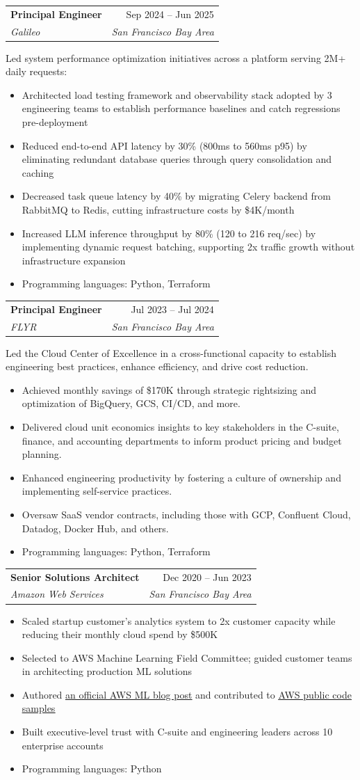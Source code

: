 \documentclass[letterpaper,11pt]{article}
\makeatletter
\newcommand{\resumeItem}[1]{
  \item\small{
    {#1 \vspace{-2pt}}
  }
}
\newcommand{\resumeSubheading}[4]{
  \vspace{-2pt}\item
    \begin{tabular*}{0.97\textwidth}[t]{l@{\extracolsep{\fill}}r}
      \textbf{#1} & #2 \\
      \textit{\small#3} & \textit{\small #4} \\
    \end{tabular*}\vspace{-7pt}
}
\newcommand{\resumeItemListStart}{\begin{itemize}}
\newcommand{\resumeItemListEnd}{\end{itemize}\vspace{-5pt}}
\makeatother
\begin{document}
    \resumeSubheading
      {Principal Engineer}{Sep 2024 -- Jun 2025}
      {Galileo}{San Francisco Bay Area}
      \vspace{2pt}\par
      Led system performance optimization initiatives across a platform serving 2M+ daily requests:
      \resumeItemListStart
        \resumeItem{Architected load testing framework and observability stack adopted by 3 engineering teams to establish performance baselines and catch regressions pre-deployment}
        \resumeItem{Reduced end-to-end API latency by 30\% (800ms to 560ms p95) by eliminating redundant database queries through query consolidation and caching}
        \resumeItem{Decreased task queue latency by 40\% by migrating Celery backend from RabbitMQ to Redis, cutting infrastructure costs by \$4K/month}
        \resumeItem{Increased LLM inference throughput by 80\% (120 to 216 req/sec) by implementing dynamic request batching, supporting 2x traffic growth without infrastructure expansion}
        \resumeItem{Programming languages: Python, Terraform}
      \resumeItemListEnd

    \resumeSubheading
      {Principal Engineer}{Jul 2023 -- Jul 2024}
      {FLYR}{San Francisco Bay Area}
      \vspace{2pt}\par
      Led the Cloud Center of Excellence in a cross-functional capacity to establish engineering best practices, enhance efficiency, and drive cost reduction.
      \resumeItemListStart
        \resumeItem{Achieved monthly savings of \$170K through strategic rightsizing and optimization of BigQuery, GCS, CI/CD, and more.}
        \resumeItem{Delivered cloud unit economics insights to key stakeholders in the C-suite, finance, and accounting departments to inform product pricing and budget planning.}
        \resumeItem{Enhanced engineering productivity by fostering a culture of ownership and implementing self-service practices.}
        \resumeItem{Oversaw SaaS vendor contracts, including those with GCP, Confluent Cloud, Datadog, Docker Hub, and others.}
        \resumeItem{Programming languages: Python, Terraform}
      \resumeItemListEnd

    \resumeSubheading
      {Senior Solutions Architect}{Dec 2020 -- Jun 2023}
      {Amazon Web Services}{San Francisco Bay Area}
      \resumeItemListStart
        \resumeItem{Scaled startup customer's analytics system to 2x customer capacity while reducing their monthly cloud spend by \$500K}
        \resumeItem{Selected to AWS Machine Learning Field Committee; guided customer teams in architecting production ML solutions}
        \resumeItem{Authored \href{https://aws.amazon.com/blogs/machine-learning/increase-your-content-reach-with-automated-document-to-speech-conversion-using-amazon-ai-services/}{\underline{an official AWS ML blog post}} and contributed to \href{https://github.com/aws-samples/scanned-documents-to-speech}{\underline{AWS public code samples}}}
        \resumeItem{Built executive-level trust with C-suite and engineering leaders across 10 enterprise accounts}
        \resumeItem{Programming languages: Python}
      \resumeItemListEnd
\end{document}
